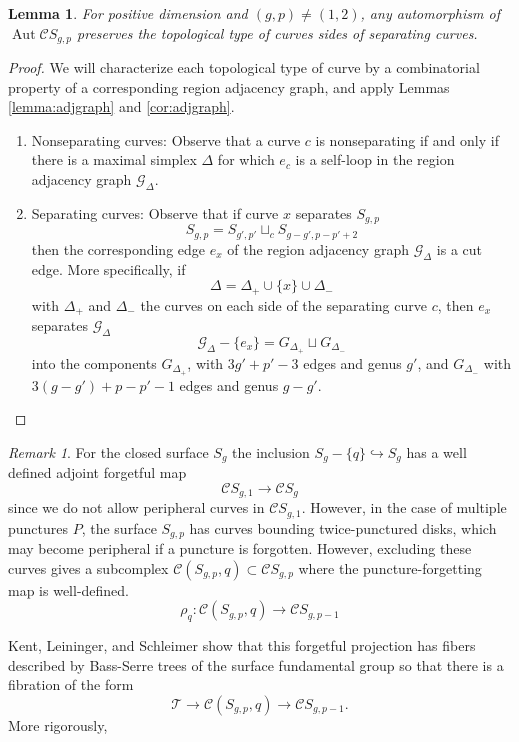 \documentclass[11pt]{article}
\DeclareMathOperator{\aaut}{Aut}
\newtheorem{lemma}[theorem]{Lemma}
\theoremstyle{remark}
\newtheorem{remark}[theorem]{Remark}
\theoremstyle{definition}
\begin{document}
\begin{lemma}
  For positive dimension and $(g,p)\neq(1,2)$, any automorphism of
  $ \aaut \mathcal C S_{g,p}$
  preserves the topological type of curves
  sides of separating curves.
  \label{lemma:curvetype}
\end{lemma}
\begin{proof}
  We will characterize each topological type of curve
  by a combinatorial property of a corresponding region adjacency graph,
  and apply Lemmas
  \ref{lemma:adjgraph} and \ref{cor:adjgraph}.

  \begin{enumerate}[$\cdot$]
    \item Nonseparating curves:
    Observe that a curve $c$ is nonseparating if and only if
    there is a maximal simplex $\Delta$ for which $e_c$
    is a self-loop in the region adjacency graph $\mathcal G_\Delta$.
    \item Separating curves:
    Observe that if curve $x$ separates $S_{g,p}$
    $$
    S_{g,p} = S_{g',p'} \sqcup_c S_{g-g',p-p'+2}
    $$
    then the corresponding edge $e_x$ of the
    region adjacency graph
    $\mathcal G_\Delta$
    is a cut edge.
    More specifically, if
    $$\Delta = \Delta_+ \cup \{x\} \cup \Delta_-$$
    with $\Delta_+$ and $\Delta_-$
    the curves on each side of the separating curve $c$,
    then $e_x$ separates $\mathcal G_\Delta$
    $$\mathcal G_\Delta  - \{e_x\}  = G_{\Delta_+} \sqcup G_{\Delta_-}$$
    into the components
    $G_{\Delta_+}$, with
    $3g'+p'-3$ edges and genus $g'$,
    and $G_{\Delta_-}$ with $3(g-g')+p-p'-1$ edges and genus $g-g'$.
  \end{enumerate}
  \end{proof}




\begin{remark}
For the closed surface $S_g$ the inclusion $S_{g}-\{q\} \hookrightarrow S_{g}$
has a well defined adjoint forgetful map
$$
\mathcal C S_{g,1} \to \mathcal C S_g
$$
since we do not allow peripheral curves in $\mathcal C S_{g,1}$.
However, in the case of multiple punctures $P$,
the surface $S_{g,p}$ has curves bounding twice-punctured disks,
which may become peripheral if a puncture is forgotten.
However, excluding these curves
gives a subcomplex $\mathcal C(S_{g,p},q) \subset \mathcal C S_{g,p}$
where the puncture-forgetting map is well-defined.
$$
\rho_q: \mathcal C(S_{g,p},q) \to \mathcal C S_{g,p-1}
$$

Kent, Leininger, and Schleimer \cite{MR2599078}
show that this forgetful projection has
fibers described by Bass-Serre trees of the surface fundamental group
so that there is a fibration of the form
$$
\mathcal T \to \mathcal C(S_{g,p},q) \to \mathcal C S_{g,p-1}.
$$
More rigorously,
\end{remark}
\end{document}

